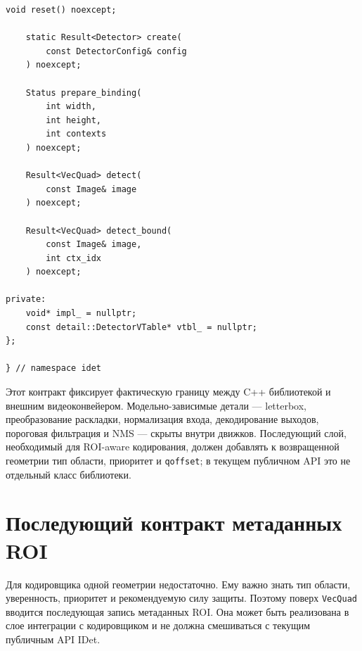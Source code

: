 \documentclass[12pt,a4paper,oneside,openany]{report}
\begin{document}
\begin{lstlisting}[caption={Сокращенный фрагмент публичного API IDet},label={lst:idet_public_api}]
    void reset() noexcept;

    static Result<Detector> create(
        const DetectorConfig& config
    ) noexcept;

    Status prepare_binding(
        int width,
        int height,
        int contexts
    ) noexcept;

    Result<VecQuad> detect(
        const Image& image
    ) noexcept;

    Result<VecQuad> detect_bound(
        const Image& image,
        int ctx_idx
    ) noexcept;

private:
    void* impl_ = nullptr;
    const detail::DetectorVTable* vtbl_ = nullptr;
};

} // namespace idet
\end{lstlisting}

Этот контракт фиксирует фактическую границу между C++ библиотекой и внешним видеоконвейером. Модельно-зависимые детали --- letterbox, преобразование раскладки, нормализация входа, декодирование выходов, пороговая фильтрация и NMS --- скрыты внутри движков. Последующий слой, необходимый для ROI-aware кодирования, должен добавлять к возвращенной геометрии тип области, приоритет и \texttt{qoffset}; в текущем публичном API это не отдельный класс библиотеки.

\section{Последующий контракт метаданных ROI}

Для кодировщика одной геометрии недостаточно. Ему важно знать тип области, уверенность, приоритет и рекомендуемую силу защиты. Поэтому поверх \texttt{VecQuad} вводится последующая запись метаданных ROI. Она может быть реализована в слое интеграции с кодировщиком и не должна смешиваться с текущим публичным API IDet.
\end{document}
